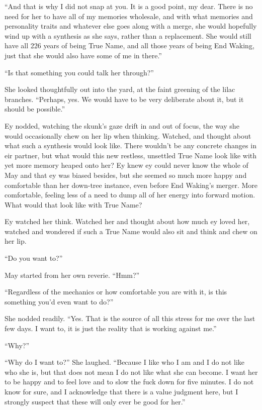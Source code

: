 ``And that is why I did not snap at you. It is a good point, my dear. There is no need for her to have all of my memories wholesale, and with what memories and personality traits and whatever else goes along with a merge, she would hopefully wind up with a synthesis as she says, rather than a replacement. She would still have all 226 years of being True Name, and all those years of being End Waking, just that she would also have some of me in there.''

``Is that something you could talk her through?''

She looked thoughtfully out into the yard, at the faint greening of the lilac branches. ``Perhaps, yes. We would have to be very deliberate about it, but it should be possible.''

Ey nodded, watching the skunk's gaze drift in and out of focus, the way she would occasionally chew on her lip when thinking. Watched, and thought about what such a synthesis would look like. There wouldn't be any concrete changes in eir partner, but what would this new restless, unsettled True Name look like with yet more memory heaped onto her? Ey knew ey could never know the whole of May and that ey was biased besides, but she seemed so much more happy and comfortable than her down-tree instance, even before End Waking's merger. More comfortable, feeling less of a need to dump all of her energy into forward motion. What would that look like with True Name?

Ey watched her think. Watched her and thought about how much ey loved her, watched and wondered if such a True Name would also sit and think and chew on her lip.

``Do you want to?''

May started from her own reverie. ``Hmm?''

``Regardless of the mechanics or how comfortable you are with it, is this something you'd even want to do?''

She nodded readily. ``Yes. That is the source of all this stress for me over the last few days. I want to, it is just the reality that is working against me.''

``Why?''

``Why do I want to?'' She laughed. ``Because I like who I am and I do not like who she is, but that does not mean I do not like what she can become. I want her to be happy and to feel love and to slow the fuck down for five minutes. I do not know for sure, and I acknowledge that there is a value judgment here, but I strongly suspect that these will only ever be good for her.''

